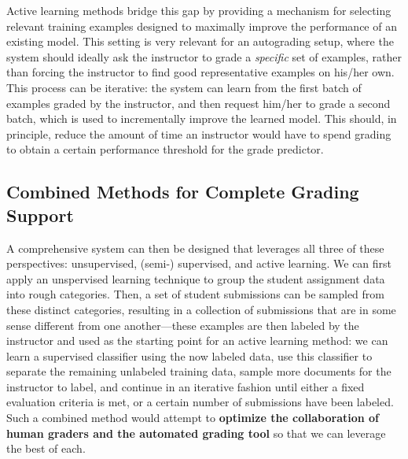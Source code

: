 Active learning methods bridge this gap by providing a mechanism for
selecting relevant training examples designed to maximally improve the
performance of an existing model. This setting is very relevant for an
autograding setup, where the system should ideally ask the instructor to
grade a \emph{specific} set of examples, rather than forcing the
instructor to find good representative examples on his/her own. This
process can be iterative: the system can learn from the first batch of
examples graded by the instructor, and then request him/her to grade a
second batch, which is used to incrementally improve the learned model.
This should, in principle, reduce the amount of time an instructor would
have to spend grading to obtain a certain performance threshold for the
grade predictor.

\subsection{Combined Methods for Complete Grading Support}

A comprehensive system can then be designed that leverages all three of
these perspectives: unsupervised, (semi-) supervised, and active learning.
We can first apply an unspervised learning technique to group the student
assignment data into rough categories. Then, a set of student submissions
can be sampled from these distinct categories, resulting in a collection of
submissions that are in some sense different from one another---these
examples are then labeled by the instructor and used as the starting point
for an active learning method: we can learn a supervised classifier using
the now labeled data, use this classifier to separate the remaining
unlabeled training data, sample more documents for the instructor to label,
and continue in an iterative fashion until either a fixed evaluation
criteria is met, or a certain number of submissions have been labeled.
Such a combined method would attempt to {\bf optimize the collaboration of human graders
and the automated grading tool}  so that we can leverage the best of each. 

